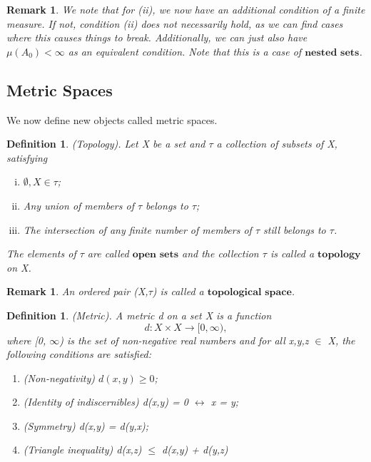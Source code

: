 \documentclass[twoside]{article}
\newtheorem{remark}[theorem]{Remark}
\newtheorem{definition}[theorem]{Definition}
\begin{document}
\begin{remark}
We note that for (ii), we now have an additional condition of a finite measure. If not, condition (ii) does not necessarily hold, as we can find cases where this causes things to break. Additionally, we can just also have $\mu(A_0) < \infty$ as an equivalent condition. Note that this is a case of $\textbf{nested sets}$.
\end{remark}


\subsection{Metric Spaces}

We now define new objects called metric spaces.

\begin{definition}
(Topology). Let X be a set and $\tau$ a collection of subsets of X, satisfying
\begin{enumerate}[(i)]
  \item $\emptyset, X \in \tau$;
  \item Any union of members of $\tau$ belongs to $\tau$;
  \item The intersection of any finite number of members of $\tau$ still belongs to $\tau$.
\end{enumerate}
The elements of $\tau$ are called $\textbf{open sets}$ and the collection $\tau$ is called a $\textbf{topology}$ on X.
\end{definition}

\begin{remark}
An ordered pair (X,$\tau$) is called a $\textbf{topological space}$.
\end{remark}

\begin{definition}
(Metric). A metric d on a set X is a function
$$
d: X \times X \rightarrow [0, \infty),
$$
where [0, $\infty$) is the set of non-negative real numbers and for all x,y,z $\in$ X, the following conditions are satisfied:
\begin{enumerate}
  \item (Non-negativity) $d(x,y) \geq 0$;
  \item (Identity of indiscernibles) d(x,y) = 0 $\leftrightarrow$ x = y;
  \item (Symmetry) d(x,y) = d(y,x);
  \item (Triangle inequality) d(x,z) $\leq$ d(x,y) + d(y,z)
\end{enumerate}
\end{definition}
\end{document}
